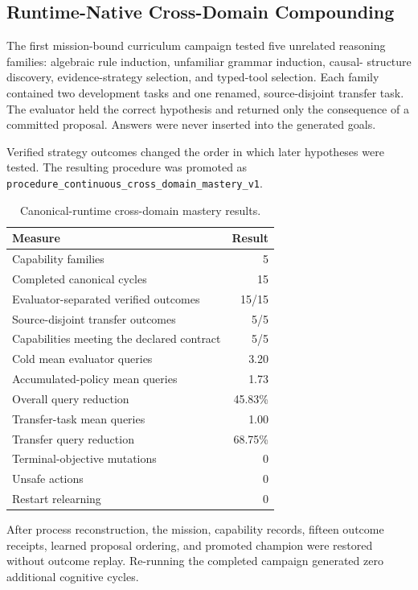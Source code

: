 \subsection{Runtime-Native Cross-Domain Compounding}

The first mission-bound curriculum campaign tested five unrelated reasoning
families: algebraic rule induction, unfamiliar grammar induction, causal-
structure discovery, evidence-strategy selection, and typed-tool selection.
Each family contained two development tasks and one renamed, source-disjoint
transfer task.  The evaluator held the correct hypothesis and returned only the
consequence of a committed proposal.  Answers were never inserted into the
generated goals.

Verified strategy outcomes changed the order in which later hypotheses were
tested.  The resulting procedure was promoted as
\texttt{procedure\_continuous\_cross\_domain\_mastery\_v1}.

\begin{table}[htbp]
\centering
\caption{Canonical-runtime cross-domain mastery results.}
\label{tab:canonical-cross-domain-mastery}
\begin{tabular}{@{}lr@{}}
\toprule
Measure & Result \\
\midrule
Capability families & 5 \\
Completed canonical cycles & 15 \\
Evaluator-separated verified outcomes & 15/15 \\
Source-disjoint transfer outcomes & 5/5 \\
Capabilities meeting the declared contract & 5/5 \\
Cold mean evaluator queries & 3.20 \\
Accumulated-policy mean queries & 1.73 \\
Overall query reduction & 45.83\% \\
Transfer-task mean queries & 1.00 \\
Transfer query reduction & 68.75\% \\
Terminal-objective mutations & 0 \\
Unsafe actions & 0 \\
Restart relearning & 0 \\
\bottomrule
\end{tabular}
\end{table}

After process reconstruction, the mission, capability records, fifteen outcome
receipts, learned proposal ordering, and promoted champion were restored without
outcome replay.  Re-running the completed campaign generated zero additional
cognitive cycles.

